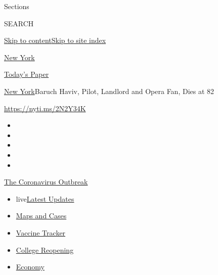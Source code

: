 Sections

SEARCH

\protect\hyperlink{site-content}{Skip to
content}\protect\hyperlink{site-index}{Skip to site index}

\href{https://www.nytimes.com/section/nyregion}{New York}

\href{https://myaccount.nytimes.com/auth/login?response_type=cookie\&client_id=vi}{}

\href{https://www.nytimes.com/section/todayspaper}{Today's Paper}

\href{/section/nyregion}{New York}\textbar{}Baruch Haviv, Pilot,
Landlord and Opera Fan, Dies at 82

\url{https://nyti.ms/2N2Y34K}

\begin{itemize}
\item
\item
\item
\item
\item
\end{itemize}

\href{https://www.nytimes.com/news-event/coronavirus?action=click\&pgtype=Article\&state=default\&region=TOP_BANNER\&context=storylines_menu}{The
Coronavirus Outbreak}

\begin{itemize}
\tightlist
\item
  live\href{https://www.nytimes.com/2020/08/03/world/coronavirus-covid-19.html?action=click\&pgtype=Article\&state=default\&region=TOP_BANNER\&context=storylines_menu}{Latest
  Updates}
\item
  \href{https://www.nytimes.com/interactive/2020/us/coronavirus-us-cases.html?action=click\&pgtype=Article\&state=default\&region=TOP_BANNER\&context=storylines_menu}{Maps
  and Cases}
\item
  \href{https://www.nytimes.com/interactive/2020/science/coronavirus-vaccine-tracker.html?action=click\&pgtype=Article\&state=default\&region=TOP_BANNER\&context=storylines_menu}{Vaccine
  Tracker}
\item
  \href{https://www.nytimes.com/2020/08/02/us/covid-college-reopening.html?action=click\&pgtype=Article\&state=default\&region=TOP_BANNER\&context=storylines_menu}{College
  Reopening}
\item
  \href{https://www.nytimes.com/live/2020/08/03/business/stock-market-today-coronavirus?action=click\&pgtype=Article\&state=default\&region=TOP_BANNER\&context=storylines_menu}{Economy}
\end{itemize}

